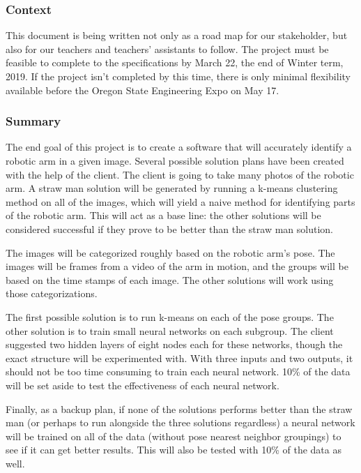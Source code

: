 \documentclass[10pt,journal,compsoc, draftclsnofoot,onecolumn]{IEEEtran}
\begin{document}
\subsubsection{Context}
This document is being written not only as a road map for our stakeholder, but also for our teachers and teachers' assistants to follow.
The project must be feasible to complete to the specifications by March 22, the end of Winter term, 2019.
If the project isn't completed by this time, there is only minimal flexibility available before the Oregon State Engineering Expo on May 17.

\subsubsection{Summary}
The end goal of this project is to create a software that will accurately identify a robotic arm in a given image.
Several possible solution plans have been created with the help of the client.
The client is going to take many photos of the robotic arm.
A straw man solution will be generated by running a k-means clustering method on all of the images, which will yield a naive method for identifying parts of the robotic arm.
This will act as a base line: the other solutions will be considered successful if they prove to be better than the straw man solution.

\noindent
The images will be categorized roughly based on the robotic arm's pose.
The images will be frames from a video of the arm in motion, and the groups will be based on the time stamps of each image.
The other solutions will work using those categorizations.

\noindent
The first possible solution is to run k-means on each of the pose groups.
The other solution is to train small neural networks on each subgroup. The client suggested two hidden layers of eight nodes each for these networks, though the exact structure will be experimented with.
With three inputs and two outputs, it should not be too time consuming to train each neural network.
10\% of the data will be set aside to test the effectiveness of each neural network.

\noindent
Finally, as a backup plan, if none of the solutions performs better than the straw man (or perhaps to run alongside the three solutions regardless) a neural network will be trained on all of the data (without pose nearest neighbor groupings) to see if it can get better results.
This will also be tested with 10\% of the data as well.
\end{document}
